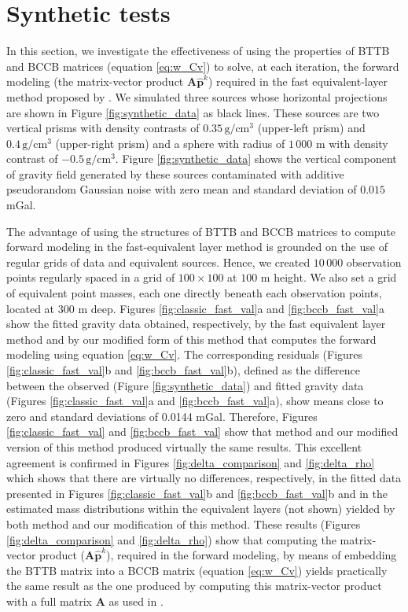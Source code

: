 \section{Synthetic tests}


In this section, we  investigate the effectiveness of using the properties of BTTB and BCCB matrices 
(equation \ref{eq:w_Cv})  to solve, at each iteration, the forward modeling (the matrix-vector product 
$\mathbf{A} \hat{\mathbf{p}}^k$)  required in the fast equivalent-layer method proposed by \citet{siqueira-etal2017}. 
We simulated three sources whose horizontal projections are shown in Figure \ref{fig:synthetic_data} as black lines. 
These sources are two vertical prisms with density contrasts of $0.35\, \mathrm{g/cm^3}$ (upper-left prism) and 
$0.4\, \mathrm{g/cm^3}$ (upper-right prism) and a sphere with radius of $1\,000$ m with density contrast of 
$-0.5\, \mathrm{g/cm^3}$. Figure \ref{fig:synthetic_data}  shows the vertical component of gravity field generated 
by these sources contaminated with additive pseudorandom Gaussian noise with zero mean and standard deviation of 
$0.015$ mGal.
 
The advantage of using the structures of BTTB and BCCB matrices to compute forward modeling in  the fast-equivalent 
layer method \cite[]{siqueira-etal2017} is grounded on the use of regular grids of data and equivalent sources. 
Hence, we created $10\,000$ observation points regularly spaced in a grid of $100 \times 100$ at $100$ m height. 
We also set a grid of equivalent point masses, each one directly beneath each observation points, located at 
$300$ m deep.  Figures \ref{fig:classic_fast_val}a and \ref{fig:bccb_fast_val}a  show the fitted gravity data 
obtained, respectively, by the fast equivalent layer method and by our modified form of this method that computes 
the forward modeling using equation \ref{eq:w_Cv}. The corresponding residuals (Figures \ref{fig:classic_fast_val}b 
and \ref{fig:bccb_fast_val}b), defined as the difference between the observed (Figure  \ref{fig:synthetic_data}) 
and fitted gravity data (Figures \ref{fig:classic_fast_val}a and \ref{fig:bccb_fast_val}a), show means close to 
zero  and standard deviations of 0.0144 mGal.  Therefore, Figures \ref{fig:classic_fast_val} and 
\ref{fig:bccb_fast_val} show that \citet{siqueira-etal2017} method and our modified version of this method produced 
virtually the same results. This excellent agreement is confirmed in Figures \ref{fig:delta_comparison} and 
\ref{fig:delta_rho} which shows that there are virtually no differences, respectively,  in the fitted data presented 
in Figures \ref{fig:classic_fast_val}b and \ref{fig:bccb_fast_val}b and in the estimated mass distributions within 
the equivalent layers (not shown) yielded by both \citet{siqueira-etal2017} method and our modification of this method. 
These results (Figures \ref{fig:delta_comparison} and \ref{fig:delta_rho})  show that computing the matrix-vector 
product ($\mathbf{A} \hat{\mathbf{p}}^k$), required in the forward modeling, by means of embedding the BTTB matrix into 
a BCCB matrix (equation \ref{eq:w_Cv}) yields practically the same result as the one produced by computing this 
matrix-vector product  with a full matrix $\mathbf{A}$ as used in \citet{siqueira-etal2017}.

